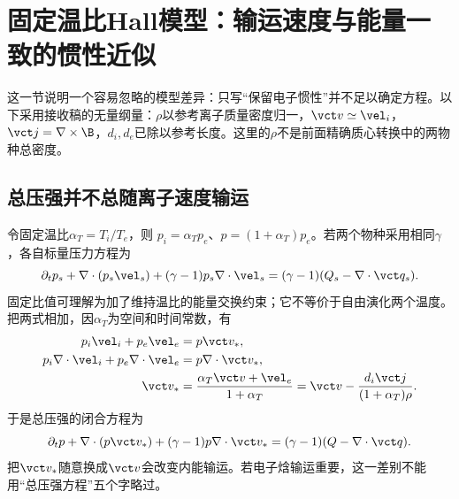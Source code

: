 \section{固定温比Hall模型：输运速度与能量一致的惯性近似}
这一节说明一个容易忽略的模型差异：只写“保留电子惯性”并不足以确定方程。以下采用\citet{L296}接收稿的无量纲量：$\rho$以参考离子质量密度归一，$\vct v\simeq\vel_i$，$\vct j=\nabla\times\B$，$d_i,d_e$已除以参考长度。这里的$\rho$不是前面精确质心转换中的两物种总密度。

\subsection{总压强并不总随离子速度输运}
令固定温比$\alpha_T=T_i/T_e$，则
$p_i=\alpha_Tp_e$、$p=(1+\alpha_T)p_e$。若两个物种采用相同$\gamma$，各自标量压力方程为
\begin{equation}
 \partial_tp_s+\nabla\cdot(p_s\vel_s)
 +(\gamma-1)p_s\nabla\cdot\vel_s
 =(\gamma-1)(Q_s-\nabla\cdot\vct q_s).
\end{equation}
固定比值可理解为加了维持温比的能量交换约束；它不等价于自由演化两个温度。把两式相加，因$\alpha_T$为空间和时间常数，有
\begin{align}
 p_i\vel_i+p_e\vel_e&=p\vct v_*,\\
 p_i\nabla\cdot\vel_i+p_e\nabla\cdot\vel_e&=p\nabla\cdot\vct v_*,\\
 \vct v_*&=\frac{\alpha_T\vct v+\vel_e}{1+\alpha_T}
 =\vct v-\frac{d_i\vct j}{(1+\alpha_T)\rho}.
\end{align}
于是总压强的闭合方程为
\begin{equation}
 \partial_tp+\nabla\cdot(p\vct v_*)
 +(\gamma-1)p\nabla\cdot\vct v_*
 =(\gamma-1)(Q-\nabla\cdot\vct q).
\end{equation}
把$\vct v_*$随意换成$\vct v$会改变内能输运。若电子焓输运重要，这一差别不能用“总压强方程”五个字略过。

